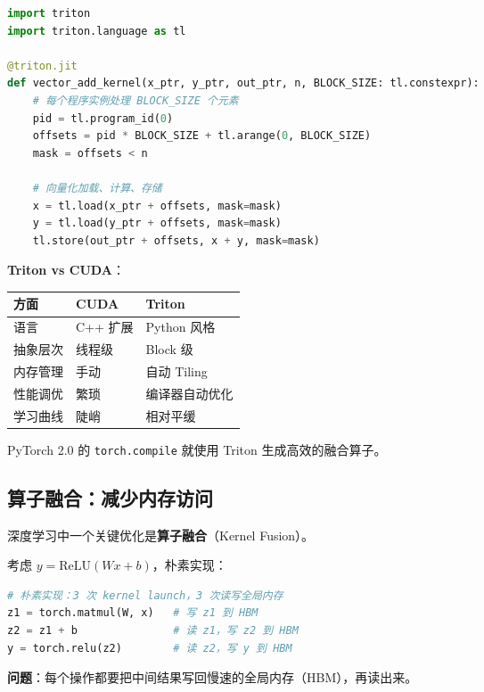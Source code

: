 \begin{lstlisting}[style=teaching, language=Python]
import triton
import triton.language as tl

@triton.jit
def vector_add_kernel(x_ptr, y_ptr, out_ptr, n, BLOCK_SIZE: tl.constexpr):
    # 每个程序实例处理 BLOCK_SIZE 个元素
    pid = tl.program_id(0)
    offsets = pid * BLOCK_SIZE + tl.arange(0, BLOCK_SIZE)
    mask = offsets < n
    
    # 向量化加载、计算、存储
    x = tl.load(x_ptr + offsets, mask=mask)
    y = tl.load(y_ptr + offsets, mask=mask)
    tl.store(out_ptr + offsets, x + y, mask=mask)
\end{lstlisting}

\textbf{Triton vs CUDA}：

\begin{center}
\renewcommand{\arraystretch}{1.4}
\begin{tabular}{l|l|l}
\toprule
\textbf{方面} & \textbf{CUDA} & \textbf{Triton} \\
\midrule
语言 & C++ 扩展 & Python 风格 \\
抽象层次 & 线程级 & Block 级 \\
内存管理 & 手动 & 自动 Tiling \\
性能调优 & 繁琐 & 编译器自动优化 \\
学习曲线 & 陡峭 & 相对平缓 \\
\bottomrule
\end{tabular}
\end{center}

PyTorch 2.0 的 \texttt{torch.compile} 就使用 Triton 生成高效的融合算子。

\subsection*{算子融合：减少内存访问}

深度学习中一个关键优化是\textbf{算子融合}（Kernel Fusion）。

考虑 $y = \text{ReLU}(Wx + b)$，朴素实现：

\begin{lstlisting}[style=teaching, language=Python]
# 朴素实现：3 次 kernel launch，3 次读写全局内存
z1 = torch.matmul(W, x)   # 写 z1 到 HBM
z2 = z1 + b               # 读 z1，写 z2 到 HBM  
y = torch.relu(z2)        # 读 z2，写 y 到 HBM
\end{lstlisting}

\textbf{问题}：每个操作都要把中间结果写回慢速的全局内存（HBM），再读出来。

